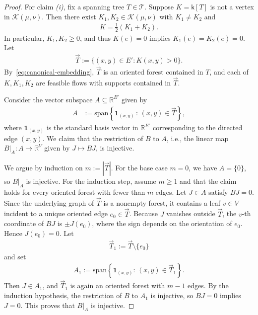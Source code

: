 \documentclass[11pt,a4paper]{article}
\newcommand{\setoftrees}{{\mathcal{T}}}
\newcommand{\embedding}{{\mathsf{k}}}
\newcommand{\flowpoly}{{\mathcal{K}}}
\begin{document}
    \begin{proof}
        For claim \emph{(i)}, fix a spanning tree $T\in\setoftrees$. Suppose $K=\embedding[T]$ is not a vertex in $\flowpoly(\mu,\nu)$. Then there exist $K_1,K_2\in\flowpoly(\mu,\nu)$ with $K_1\neq K_2$ and
            \begin{align*}
                K = \frac{1}{2}(K_1+K_2).
            \end{align*}
        In particular, $K_1,K_2\ge 0$, and thus $K(e)=0$ implies $K_1(e)=K_2(e)=0$. Let
            \begin{align*}
                \overrightarrow{T} := \{(x,y)\in E' : K(x,y) > 0\}.
            \end{align*}
        By~\cref{eq:canonical-embedding}, $\overrightarrow{T}$ is an oriented forest contained in $T$, and each of $K,K_1,K_2$ are feasible flows with supports contained in $\overrightarrow{T}$. 

        Consider the vector subspace $A\subseteq\mathbb{R}^{E'}$ given by
            \begin{align*}
                A &:= \mathrm{span} \left\{ \mathbf{1}_{(x,y)} \,:\, (x,y)\in\overrightarrow{T} \right\},
            \end{align*}
        where $\mathbf{1}_{(x,y)}$ is the standard basis vector in $\mathbb{R}^{E'}$ corresponding to the directed edge $(x,y)$. We claim that the restriction of $B$ to $A$, i.e., the linear map $B|_{A}:A\to\mathbb{R}^{V}$ given by $J\mapsto BJ$, is injective. 

        We argue by induction on $m:=|\overrightarrow{T}|$. For the base case $m=0$, we have $A=\{0\}$, so $B|_A$ is injective. For the induction step, assume $m\ge 1$ and that the claim holds for every oriented forest with fewer than $m$ edges. Let $J\in A$ satisfy $BJ=0$. Since the underlying graph of $\overrightarrow{T}$ is a nonempty forest, it contains a leaf $v\in V$ incident to a unique oriented edge $e_0\in\overrightarrow{T}$. Because $J$ vanishes outside $\overrightarrow{T}$, the $v$-th coordinate of $BJ$ is $\pm J(e_0)$, where the sign depends on the orientation of $e_0$. Hence $J(e_0)=0$. Let
            \begin{align*}
                \overrightarrow{T}_1 := \overrightarrow{T}\setminus\{e_0\}
            \end{align*}
        and set
            \begin{align*}
                A_1 := \mathrm{span}\left\{\mathbf{1}_{(x,y)}:\,(x,y)\in\overrightarrow{T}_1\right\}.
            \end{align*}
        Then $J\in A_1$, and $\overrightarrow{T}_1$ is again an oriented forest with $m-1$ edges. By the induction hypothesis, the restriction of $B$ to $A_1$ is injective, so $BJ=0$ implies $J=0$. This proves that $B|_A$ is injective.


\end{proof}
\end{document}
